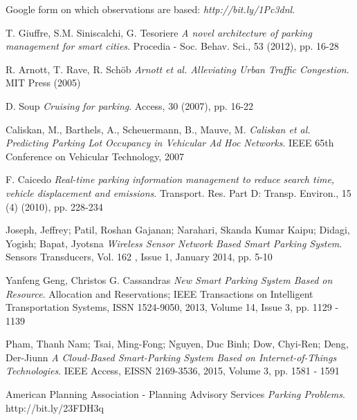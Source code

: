 \documentclass{acm_proc_article-sp}
\begin{document}
\begin{thebibliography}{10}
Google form on which observations are based:
\textit{http://bit.ly/1Pc3dnl}.
 
T. Giuffre, S.M. Siniscalchi, G. Tesoriere
\textit{A novel architecture of parking management for smart cities}.
Procedia - Soc. Behav. Sci., 53 (2012), pp. 16-28

R. Arnott, T. Rave, R. Schöb
\textit{Arnott et al. Alleviating Urban Traffic Congestion}.
MIT Press (2005)

D. Soup
\textit{Cruising for parking}.
Access, 30 (2007), pp. 16-22

Caliskan, M., Barthels, A., Scheuermann, B., Mauve, M.
\textit{Caliskan et al. Predicting Parking Lot Occupancy in Vehicular Ad Hoc Networks}.
IEEE 65th Conference on Vehicular Technology, 2007

F. Caicedo
\textit{Real-time parking information management to reduce search time, vehicle displacement and emissions}.
Transport. Res. Part D: Transp. Environ., 15 (4) (2010), pp. 228-234

Joseph, Jeffrey; Patil, Roshan Gajanan; Narahari, Skanda Kumar Kaipu; Didagi, Yogish; Bapat, Jyotsna
\textit{Wireless Sensor Network Based Smart Parking System}.
Sensors  Transducers, Vol. 162 , Issue 1, January 2014, pp. 5-10

Yanfeng Geng, Christos G. Cassandras
\textit{New \textsc{}Smart Parking\textsc{} System Based on Resource}.
Allocation and Reservations; IEEE Transactions on Intelligent Transportation Systems, ISSN 1524-9050, 2013, Volume 14, Issue 3, pp. 1129 - 1139

Pham, Thanh Nam; Tsai, Ming-Fong; Nguyen, Duc Binh; Dow, Chyi-Ren; Deng, Der-Jiunn
\textit{A Cloud-Based Smart-Parking System Based on Internet-of-Things Technologies}.
IEEE Access, EISSN 2169-3536, 2015, Volume 3, pp. 1581 - 1591

American Planning Association - Planning Advisory Services
\textit{Parking Problems}.
http://bit.ly/23FDH3q

\end{thebibliography}



%
%

\end{document}

